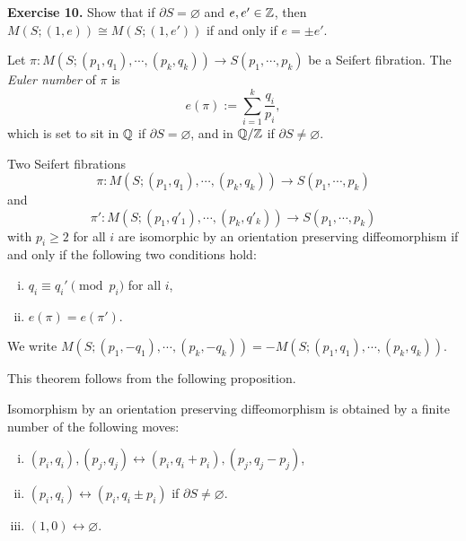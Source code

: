 \documentclass{../../small}
\begin{document}
\noindent\textbf{Exercise 10.} Show that if $\partial S=\varnothing$ and $e,e'\in\mathbb{Z}$, then $M(S;(1,e))\cong M(S;(1,e'))$ if and only if $e=\pm e'$.

Let $\pi:M(S;(p_1,q_1),\cdots,(p_k,q_k))\to S(p_1,\cdots,p_k)$ be a Seifert fibration.
The \emph{Euler number} of $\pi$ is
\[e(\pi):=\sum_{i=1}^k\frac{q_i}{p_i},\]
which is set to sit in $\mathbb{Q}$ if $\partial S=\varnothing$, and in $\mathbb{Q}/\mathbb{Z}$ if $\partial S\ne\varnothing$.


\begin{thm}
Two Seifert fibrations
\[\pi:M(S;(p_1,q_1),\cdots,(p_k,q_k))\to S(p_1,\cdots,p_k)\]
and
\[\pi':M(S;(p_1,q'_1),\cdots,(p_k,q'_k))\to S(p_1,\cdots,p_k)\]
with $p_i\ge2$ for all $i$ are isomorphic by an orientation preserving diffeomorphism if and only if the following two conditions hold:
\begin{enumerate}[(i)]
\item $q_i\equiv q_i'\pmod{p_i}$ for all $i$,
\item $e(\pi)=e(\pi')$.
\end{enumerate}
\end{thm}
\begin{rmk*}
We write $M(S;(p_1,-q_1),\cdots,(p_k,-q_k))=-M(S;(p_1,q_1),\cdots,(p_k,q_k))$. 
\end{rmk*}
This theorem follows from the following proposition.
\begin{prop}
Isomorphism by an orientation preserving diffeomorphism is obtained by a finite number of the following moves:
\begin{enumerate}[(i)]
\item $(p_i,q_i),(p_j,q_j)\leftrightarrow(p_i,q_i+p_i),(p_j,q_j-p_j)$,
\item $(p_i,q_i)\leftrightarrow(p_i,q_i\pm p_i)$ if $\partial S\ne\varnothing$.
\item $(1,0)\leftrightarrow\varnothing$.
\end{enumerate}
\end{prop}
\end{document}
